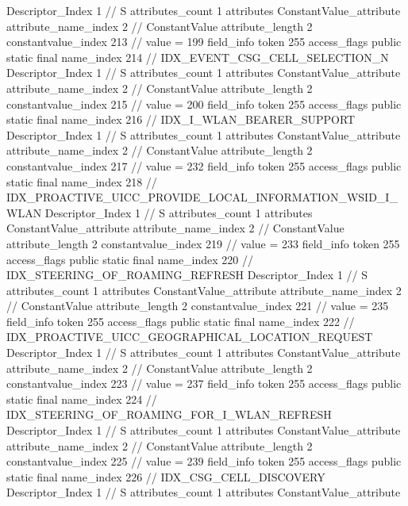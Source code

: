 {{{{{				Descriptor_Index	1		// S
				attributes_count	1
				attributes {
				ConstantValue_attribute {
					attribute_name_index	2		// ConstantValue
					attribute_length	2
					constantvalue_index	213		// value = 199
				}
				}
			}
			field_info {
				token	255
				access_flags	public static final
				name_index	214		// IDX_EVENT_CSG_CELL_SELECTION_N
				Descriptor_Index	1		// S
				attributes_count	1
				attributes {
				ConstantValue_attribute {
					attribute_name_index	2		// ConstantValue
					attribute_length	2
					constantvalue_index	215		// value = 200
				}
				}
			}
			field_info {
				token	255
				access_flags	public static final
				name_index	216		// IDX_I_WLAN_BEARER_SUPPORT
				Descriptor_Index	1		// S
				attributes_count	1
				attributes {
				ConstantValue_attribute {
					attribute_name_index	2		// ConstantValue
					attribute_length	2
					constantvalue_index	217		// value = 232
				}
				}
			}
			field_info {
				token	255
				access_flags	public static final
				name_index	218		// IDX_PROACTIVE_UICC_PROVIDE_LOCAL_INFORMATION_WSID_I_WLAN
				Descriptor_Index	1		// S
				attributes_count	1
				attributes {
				ConstantValue_attribute {
					attribute_name_index	2		// ConstantValue
					attribute_length	2
					constantvalue_index	219		// value = 233
				}
				}
			}
			field_info {
				token	255
				access_flags	public static final
				name_index	220		// IDX_STEERING_OF_ROAMING_REFRESH
				Descriptor_Index	1		// S
				attributes_count	1
				attributes {
				ConstantValue_attribute {
					attribute_name_index	2		// ConstantValue
					attribute_length	2
					constantvalue_index	221		// value = 235
				}
				}
			}
			field_info {
				token	255
				access_flags	public static final
				name_index	222		// IDX_PROACTIVE_UICC_GEOGRAPHICAL_LOCATION_REQUEST
				Descriptor_Index	1		// S
				attributes_count	1
				attributes {
				ConstantValue_attribute {
					attribute_name_index	2		// ConstantValue
					attribute_length	2
					constantvalue_index	223		// value = 237
				}
				}
			}
			field_info {
				token	255
				access_flags	public static final
				name_index	224		// IDX_STEERING_OF_ROAMING_FOR_I_WLAN_REFRESH
				Descriptor_Index	1		// S
				attributes_count	1
				attributes {
				ConstantValue_attribute {
					attribute_name_index	2		// ConstantValue
					attribute_length	2
					constantvalue_index	225		// value = 239
				}
				}
			}
			field_info {
				token	255
				access_flags	public static final
				name_index	226		// IDX_CSG_CELL_DISCOVERY
				Descriptor_Index	1		// S
				attributes_count	1
				attributes {
				ConstantValue_attribute {
}}}}}}}
